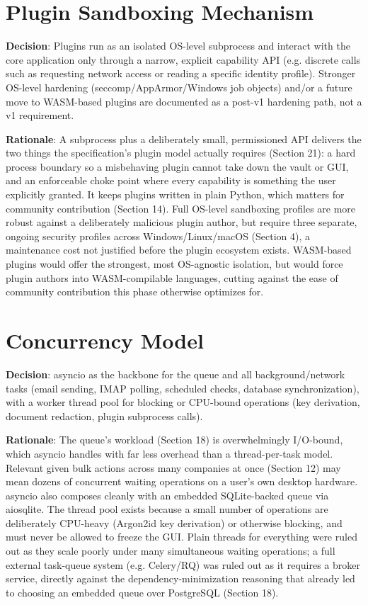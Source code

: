 \section{Plugin Sandboxing Mechanism}
\textbf{Decision}:  Plugins run as an isolated OS-level subprocess and interact with the core application only through a narrow, explicit capability API (e.g. discrete calls such as requesting network access or reading a specific identity profile). Stronger OS-level hardening (seccomp/AppArmor/Windows job objects) and/or a future move to WASM-based plugins are documented as a post-v1 hardening path, not a v1 requirement.

\textbf{Rationale}:  A subprocess plus a deliberately small, permissioned API delivers the two things the specification's plugin model actually requires (Section 21): a hard process boundary so a misbehaving plugin cannot take down the vault or GUI, and an enforceable choke point where every capability is something the user explicitly granted. It keeps plugins written in plain Python, which matters for community contribution (Section 14). Full OS-level sandboxing profiles are more robust against a deliberately malicious plugin author, but require three separate, ongoing security profiles across Windows/Linux/macOS (Section 4), a maintenance cost not justified before the plugin ecosystem exists. WASM-based plugins would offer the strongest, most OS-agnostic isolation, but would force plugin authors into WASM-compilable languages, cutting against the ease of community contribution this phase otherwise optimizes for.
\section{Concurrency Model}
\textbf{Decision}:  asyncio as the backbone for the queue and all background/network tasks (email sending, IMAP polling, scheduled checks, database synchronization), with a worker thread pool for blocking or CPU-bound operations (key derivation, document redaction, plugin subprocess calls).

\textbf{Rationale}:  The queue's workload (Section 18) is overwhelmingly I/O-bound, which asyncio handles with far less overhead than a thread-per-task model. Relevant given bulk actions across many companies at once (Section 12) may mean dozens of concurrent waiting operations on a user's own desktop hardware. asyncio also composes cleanly with an embedded SQLite-backed queue via aiosqlite. The thread pool exists because a small number of operations are deliberately CPU-heavy (Argon2id key derivation) or otherwise blocking, and must never be allowed to freeze the GUI. Plain threads for everything were ruled out as they scale poorly under many simultaneous waiting operations; a full external task-queue system (e.g. Celery/RQ) was ruled out as it requires a broker service, directly against the dependency-minimization reasoning that already led to choosing an embedded queue over PostgreSQL (Section 18).
